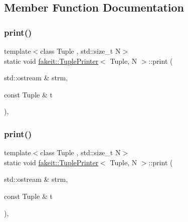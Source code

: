 \subsection{Member Function Documentation}
\mbox{\label{structfakeit_1_1TuplePrinter_a1c46b4cc8914280abd0f6a83a56db9b9}} 
\subsubsection{\texorpdfstring{print()}{print()}\hspace{0.1cm}{\footnotesize\ttfamily [1/9]}}
{\footnotesize\ttfamily template$<$class Tuple , std\+::size\+\_\+t N$>$ \\
static void \mbox{\hyperlink{structfakeit_1_1TuplePrinter}{fakeit\+::\+Tuple\+Printer}}$<$ Tuple, N $>$\+::print (\begin{DoxyParamCaption}\item[{std\+::ostream \&}]{strm,  }\item[{const Tuple \&}]{t }\end{DoxyParamCaption})\hspace{0.3cm}{\ttfamily [inline]}, {\ttfamily [static]}}

\mbox{\label{structfakeit_1_1TuplePrinter_a1c46b4cc8914280abd0f6a83a56db9b9}} 
\subsubsection{\texorpdfstring{print()}{print()}\hspace{0.1cm}{\footnotesize\ttfamily [2/9]}}
{\footnotesize\ttfamily template$<$class Tuple , std\+::size\+\_\+t N$>$ \\
static void \mbox{\hyperlink{structfakeit_1_1TuplePrinter}{fakeit\+::\+Tuple\+Printer}}$<$ Tuple, N $>$\+::print (\begin{DoxyParamCaption}\item[{std\+::ostream \&}]{strm,  }\item[{const Tuple \&}]{t }\end{DoxyParamCaption})\hspace{0.3cm}{\ttfamily [inline]}, {\ttfamily [static]}}

